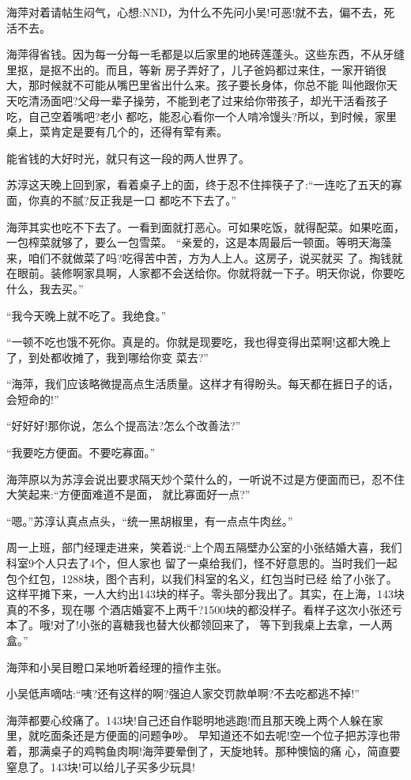 \documentclass[11pt,a4paper,onecolumn]{article}
\begin{document}
海萍对着请帖生闷气，心想:NND，为什么不先问小吴!可恶!就不去，偏不去，死活不去。

海萍得省钱。因为每一分每一毛都是以后家里的地砖莲蓬头。这些东西，不从牙缝里抠，是抠不出的。而且，等新
房子弄好了，儿子爸妈都过来住，一家开销很大，那时候就不可能从嘴巴里省出什么来。孩子要长身体，你总不能
叫他跟你天天吃清汤面吧?父母一辈子操劳，不能到老了过来给你带孩子，却光干活看孩子吃，自己空着嘴吧?老小
都吃，能忍心看你一个人啃冷馒头?所以，到时候，家里桌上，菜肯定是要有几个的，还得有荤有素。

能省钱的大好时光，就只有这一段的两人世界了。

苏淳这天晚上回到家，看着桌子上的面，终于忍不住摔筷子了:``一连吃了五天的寡面，你真的不腻?反正我是一口
都吃不下去了。''

海萍其实也吃不下去了。一看到面就打恶心。可如果吃饭，就得配菜。如果吃面，一包榨菜就够了，要么一包雪菜。
``亲爱的，这是本周最后一顿面。等明天海藻来，咱们不就做菜了吗?吃得苦中苦，方为人上人。这房子，说买就买
了。掏钱就在眼前。装修啊家具啊，人家都不会送给你。你就将就一下子。明天你说，你要吃什么，我去买。''

``我今天晚上就不吃了。我绝食。''

``一顿不吃也饿不死你。真是的。你就是现要吃，我也得变得出菜啊!这都大晚上了，到处都收摊了，我到哪给你变
菜去?''

``海萍，我们应该略微提高点生活质量。这样才有得盼头。每天都在捱日子的话，会短命的!''

``好好好!那你说，怎么个提高法?怎么个改善法?''

``我要吃方便面。不要吃寡面。''

海萍原以为苏淳会说出要求隔天炒个菜什么的，一听说不过是方便面而已，忍不住大笑起来:``方便面难道不是面，
就比寡面好一点?''

``嗯。''苏淳认真点点头，``统一黑胡椒里，有一点点牛肉丝。''

周一上班，部门经理走进来，笑着说:``上个周五隔壁办公室的小张结婚大喜，我们科室9个人只去了4个，但人家也
留了一桌给我们，怪不好意思的。当时我们一起包个红包，1288块，图个吉利，以我们科室的名义，红包当时已经
给了小张了。这样平摊下来，一人大约出143块的样子。零头部分我出了。其实，在上海，143块真的不多，现在哪
个酒店婚宴不上两千?1500块的都没样子。看样子这次小张还亏本了。哦!对了!小张的喜糖我也替大伙都领回来了，
等下到我桌上去拿，一人两盒。''

海萍和小吴目瞪口呆地听着经理的擅作主张。

小吴低声嘀咕:``咦?还有这样的啊?强迫人家交罚款单啊?不去吃都逃不掉!''

海萍都要心绞痛了。143块!自己还自作聪明地逃跑!而且那天晚上两个人躲在家里，就吃面条还是方便面的问题争吵。
早知道还不如去呢!空一个位子把苏淳也带着，那满桌子的鸡鸭鱼肉啊!海萍要晕倒了，天旋地转。那种懊恼的痛
心，简直要窒息了。143块!可以给儿子买多少玩具!
\end{document}
